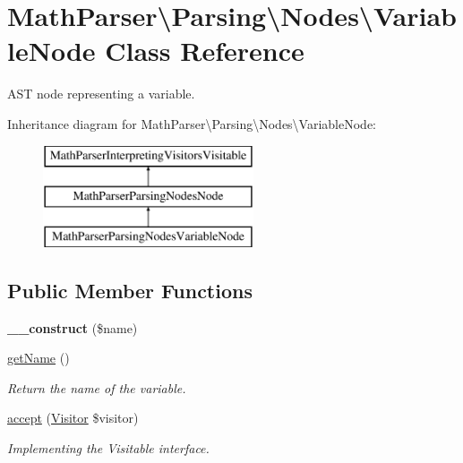 \hypertarget{classMathParser_1_1Parsing_1_1Nodes_1_1VariableNode}{\section{Math\-Parser\textbackslash{}Parsing\textbackslash{}Nodes\textbackslash{}Variable\-Node Class Reference}
\label{classMathParser_1_1Parsing_1_1Nodes_1_1VariableNode}
}


A\-S\-T node representing a variable.  


Inheritance diagram for Math\-Parser\textbackslash{}Parsing\textbackslash{}Nodes\textbackslash{}Variable\-Node\-:\begin{figure}[H]
\begin{center}
\leavevmode
\includegraphics[height=3.000000cm]{classMathParser_1_1Parsing_1_1Nodes_1_1VariableNode}
\end{center}
\end{figure}
\subsection*{Public Member Functions}
\begin{DoxyCompactItemize}
\item 
\hypertarget{classMathParser_1_1Parsing_1_1Nodes_1_1VariableNode_a5a1263313e8f1f7fb82ef1375b0aee77}{{\bfseries \-\_\-\-\_\-construct} (\$name)}\label{classMathParser_1_1Parsing_1_1Nodes_1_1VariableNode_a5a1263313e8f1f7fb82ef1375b0aee77}

\item 
\hyperlink{classMathParser_1_1Parsing_1_1Nodes_1_1VariableNode_abab1fcd4af04ba2981749368d854cfc3}{get\-Name} ()
\begin{DoxyCompactList}\small\item\em Return the name of the variable. \end{DoxyCompactList}\item 
\hypertarget{classMathParser_1_1Parsing_1_1Nodes_1_1VariableNode_a1c41ef12cc6469a2de9c2de325cf6258}{\hyperlink{classMathParser_1_1Parsing_1_1Nodes_1_1VariableNode_a1c41ef12cc6469a2de9c2de325cf6258}{accept} (\hyperlink{interfaceMathParser_1_1Interpreting_1_1Visitors_1_1Visitor}{Visitor} \$visitor)}\label{classMathParser_1_1Parsing_1_1Nodes_1_1VariableNode_a1c41ef12cc6469a2de9c2de325cf6258}

\begin{DoxyCompactList}\small\item\em Implementing the Visitable interface. \end{DoxyCompactList}\end{DoxyCompactItemize}
